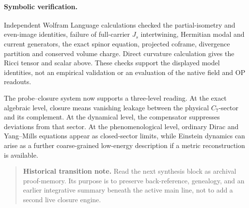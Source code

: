 \paragraph{Symbolic verification.}
Independent Wolfram Language calculations checked the partial-isometry
and even-image identities, failure of full-carrier $J_s$ intertwining,
Hermitian modal and current generators, the exact spinor equation,
projected coframe, divergence partition and conserved volume charge.
Direct curvature calculation gives the Ricci tensor and scalar above.
These checks support the displayed model identities, not an empirical
validation or an evaluation of the native field and OP readouts.

\begin{remark}
The probe--closure system now supports a three-level reading.
At the exact algebraic level, closure means vanishing leakage between the
physical $C_7$-sector and its complement.
At the dynamical level, the compensator suppresses deviations from that
sector.
At the phenomenological level, ordinary Dirac and Yang--Mills equations
appear as closed-sector limits, while Einstein dynamics can arise as a
further coarse-grained low-energy description if a metric reconstruction is
available.
\end{remark}

\begin{quote}\small
\noindent\textbf{Historical transition note.} Read the next synthesis block as archival proof-memory. Its purpose is to preserve back-reference, genealogy, and an earlier integrative summary beneath the active main line, not to add a second live closure engine.
\end{quote}


